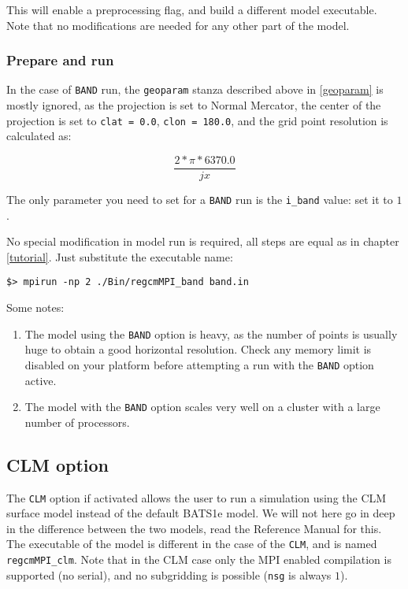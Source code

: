This will enable a preprocessing flag, and build a different model executable.
Note that no modifications are needed for any other part of the model.

\subsubsection{Prepare and run}
\label{i_band}

In the case of \verb=BAND= run, the \verb=geoparam= stanza described above in
\ref{geoparam} is mostly ignored, as the projection is set to Normal Mercator,
the center of the projection is set to \verb'clat = 0.0', \verb'clon = 180.0',
and the grid point resolution is calculated as:

\begin{equation}
\frac{2*\pi*6370.0}{jx}
\end{equation}

The only parameter you need to set for a \verb=BAND= run is the \verb=i_band=
value: set it to $1$.

No special modification in model run is required, all steps are equal as in
chapter \ref{tutorial}. Just substitute the executable name:

\begin{Verbatim}
$> mpirun -np 2 ./Bin/regcmMPI_band band.in
\end{Verbatim}

Some notes:

\begin{enumerate}
\item The model using the \verb=BAND= option is heavy, as the number of points
is usually huge to obtain a good horizontal resolution. Check any memory
limit is disabled on your platform before attempting a run with the \verb=BAND=
option active.
\item The model with the \verb=BAND= option scales very well on a cluster
with a large number of processors.
\end{enumerate}

\subsection{CLM option}
\label{clm}

The \verb=CLM= option if activated allows the user to run a simulation using
the CLM surface model instead of the default BATS1e model. We will not here go
in deep in the difference between the two models, read the Reference Manual
for this.
The executable of the model is different in the case of the \verb=CLM=, and is
named \verb=regcmMPI_clm=.
Note that in the CLM case only the MPI enabled compilation is supported (no
serial), and no subgridding is possible (\verb=nsg= is always $1$).

